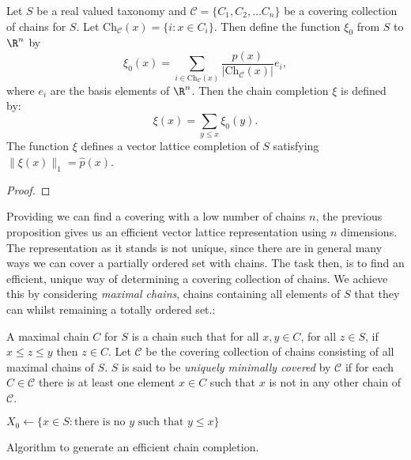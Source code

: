 \begin{prop}
\newcommand{\Ch}{\mathrm{Ch}_\mathcal{C}}
Let $S$ be a real valued taxonomy and $\mathcal{C} = \{C_1, C_2, \ldots C_n\}$ be a covering collection of chains for $S$. Let $\Ch(x) = \{i : x \in C_i\}.$ Then define the function $\xi_0$ from $S$ to $\R^n$ by
$$\xi_0(x) =  \sum_{i \in \Ch(x)} \frac{p(x)}{|\Ch(x)|}e_i,$$
where $e_i$ are the basis elements of $\R^n$. Then the chain completion $\xi$ is defined by:
$$\xi(x) = \sum_{y \le x} \xi_0(y).$$
The function $\xi$ defines a vector lattice completion of $S$ satisfying $\|\xi(x)\|_1 = \hat{p}(x)$.
\end{prop}

\begin{proof}

\end{proof}

Providing we can find a covering with a low number of chains $n$, the previous proposition gives us an efficient vector lattice representation using $n$ dimensions. The representation as it stands is not unique, since there are in general many ways we can cover a partially ordered set with chains. The task then, is to find an efficient, unique way of determining a covering collection of chains. We achieve this by considering \emph{maximal chains}, chains containing all elements of $S$ that they can whilst remaining a totally ordered set.:

\begin{defn}
A maximal chain $C$ for $S$ is a chain such that for all $x,y \in C$, for all $z \in S$, if $x \le z \le  y$ then $z \in C$. Let $\mathcal{C}$ be the covering collection of chains consisting of all maximal chains of $S$. $S$ is said to be \emph{uniquely minimally covered} by $\mathcal{C}$ if for each $C \in \mathcal{C}$ there is at least one element $x \in C$ such that $x$ is not in any other chain of $\mathcal{C}$.
\end{defn}

\begin{algorithm}
\begin{center}
\begin{algorithmic}
\vspace{0.1cm}
\STATE $X_0 \leftarrow \{x \in S : \text{there is no $y$ such that } y \le x\}$
\end{algorithmic}
\end{center}
\caption{Algorithm to generate an efficient chain completion.}
\end{algorithm}

% 
% 
 
% 